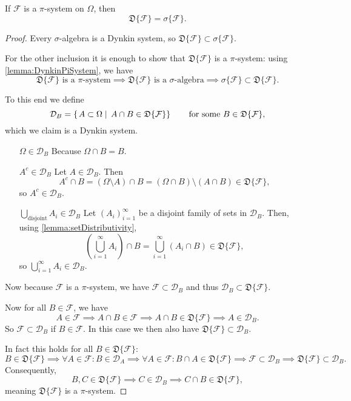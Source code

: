 \begin{proposition} \label{prop:generatedDynkinSigma}
If $\mathcal{F}$ is a $\pi$-system on $\Omega$, then
\[ \mathfrak{D}\{\mathcal{F}\} = \sigma\{\mathcal{F}\}. \]
\end{proposition}
\begin{proof}
Every $\sigma$-algebra is a Dynkin system, so $\mathfrak{D}\{\mathcal{F}\} \subset \sigma\{\mathcal{F}\}$.

For the other inclusion it is enough to show that $\mathfrak{D}\{\mathcal{F}\}$ is a $\pi$-system: using \ref{lemma:DynkinPiSystem}, we have
\[ \text{$\mathfrak{D}\{\mathcal{F}\}$ is a $\pi$-system} \implies \text{$\mathfrak{D}\{\mathcal{F}\}$ is a $\sigma$-algebra} \implies \sigma\{\mathcal{F}\}\subset\mathfrak{D}\{\mathcal{F}\}. \]

To this end we define
\[ \mathcal{D}_B = \left\{\left. A\subset\Omega \;\right|\; A\cap B\in\mathfrak{D}\{\mathcal{F}\} \right\} \qquad \text{for some $B\in\mathfrak{D}\{\mathcal{F}\}$,} \]
which we claim is a Dynkin system.
\begin{itemize}[leftmargin=2.5cm]
\item[$\boxed{\Omega\in\mathcal{D}_B}$] Because $\Omega\cap B = B$.
\item[$\boxed{A^c\in\mathcal{D}_B}$] Let $A\in\mathcal{D}_B$. Then
\[ A^c\cap B = (\Omega\setminus A)\cap B = (\Omega\cap B)\setminus(A\cap B) \in \mathfrak{D}\{\mathcal{F}\}, \]
so $A^c\in\mathcal{D}_B$.
\item[$\boxed{\bigcup_\text{disjoint}A_i \in \mathcal{D}_B}$] Let $(A_i)_{i=1}^\infty$ be a disjoint family of sets in $\mathcal{D}_B$. Then, using \ref{lemma:setDistributivity},
\[ \left(\bigcup_{i=1}^\infty A_i\right)\cap B = \bigcup_{i=1}^\infty (A_i\cap B) \in \mathfrak{D}\{\mathcal{F}\}, \]
so $\bigcup_{i=1}^\infty A_i\in\mathcal{D}_B$.
\end{itemize}
Now because $\mathcal{F}$ is a $\pi$-system, we have $\mathcal{F}\subset\mathcal{D}_B$ and thus $\mathcal{D}_B\subset\mathfrak{D}\{\mathcal{F}\}$.

Now for all $B\in\mathcal{F}$, we have
\[ A\in\mathcal{F}\implies A\cap B\in\mathcal{F}\implies A\cap B\in\mathfrak{D}\{\mathcal{F}\} \implies A\in \mathcal{D}_B. \]
So $\mathcal{F}\subset \mathcal{D}_B$ if $B\in\mathcal{F}$. In this case we then also have $\mathfrak{D}\{\mathcal{F}\}\subset \mathcal{D}_B$.

In fact this holds for all $B\in\mathfrak{D}\{\mathcal{F}\}$:
\[ B\in\mathfrak{D}\{\mathcal{F}\} \implies \forall A\in\mathcal{F}: B\in\mathcal{D}_A \implies  \forall A\in\mathcal{F}: B\cap A \in \mathfrak{D}\{\mathcal{F}\} \implies \mathcal{F}\subset\mathcal{D}_B \implies \mathfrak{D}\{\mathcal{F}\}\subset \mathcal{D}_B. \]
Consequently,
\[ B,C\in\mathfrak{D}\{\mathcal{F}\} \implies C\in\mathcal{D}_B \implies C\cap B\in\mathfrak{D}\{\mathcal{F}\}, \]
meaning $\mathfrak{D}\{\mathcal{F}\}$ is a $\pi$-system.
\end{proof}
